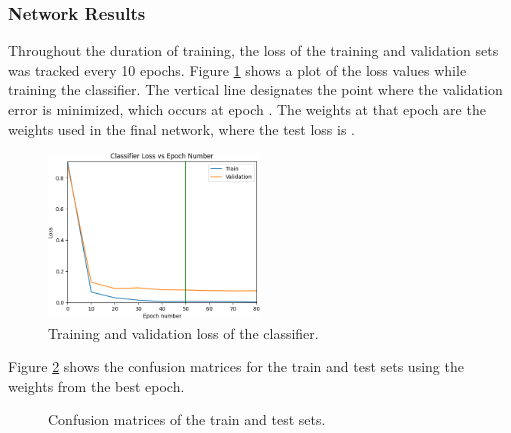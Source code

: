 \documentclass[a4paper, 12pt, titlepage]{article}
\newcommand{\figRef}[1]{Figure \ref{#1}}
\begin{document}
  \subsubsection{Network Results}
  \par Throughout the duration of training, the loss of the training and
  validation sets was tracked every 10 epochs.
  \figRef{fig:class_loss} shows a plot of the loss values while training the
  classifier.
  The vertical line designates the point where the validation error is
  minimized, which occurs at epoch
  \unskip{}.
  The weights at that epoch are the weights used in the final network, where
  the test loss is \unskip{}.
  \begin{figure}[htb]
    \centering
    \includegraphics[width=0.5\textwidth]{images/class_loss.png}
    \caption{Training and validation loss of the classifier.}
    \label{fig:class_loss}
  \end{figure}
  \par \figRef{fig:conf} shows the confusion matrices for the train and
  test sets using the weights from the best epoch.
  \begin{figure}[htb]
    \centering
    \caption{Confusion matrices of the train and test sets.}
    \label{fig:conf}
  \end{figure}
\end{document}
